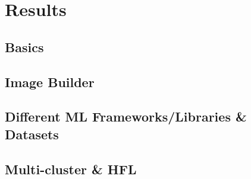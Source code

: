 \section{Results}

\subsection{Basics}

\subsection{Image Builder}

\subsection{Different ML Frameworks/Libraries \& Datasets}


\subsection{Multi-cluster \& HFL}